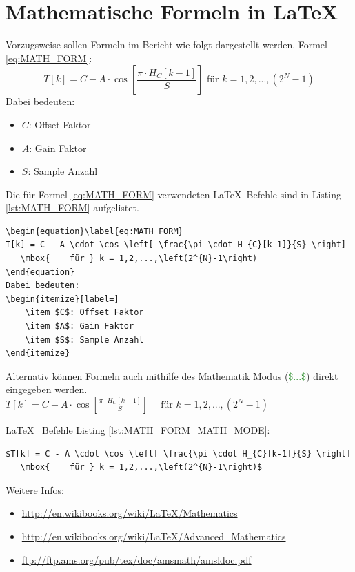 \documentclass[TGAI_Laborbericht.tex]{subfiles}
\begin{document}
\section{Mathematische Formeln in \LaTeX}
Vorzugsweise sollen Formeln im Bericht wie folgt dargestellt werden.\linebreak
Formel \ref{eq:MATH_FORM}:
\begin{equation}\label{eq:MATH_FORM}
T[k]=C-A\cdot\cos\left[\frac{\pi \cdot H_{C}[k-1]}{S}\right]   \mbox{    für } k = 1,2,...,\left(2^{N}-1\right)
\end{equation}
Dabei bedeuten:
\begin{itemize}[label=]
    \item $C$: Offset Faktor
    \item $A$: Gain Faktor
    \item $S$: Sample Anzahl
\end{itemize}
Die für Formel \ref{eq:MATH_FORM} verwendeten \LaTeX ~Befehle sind in Listing \ref{lst:MATH_FORM} aufgelistet.
\begin{lstlisting}[style=LATEX, frame=single, caption=Latex Befehle für Formel \ref{eq:MATH_FORM}, captionpos=b, label=lst:MATH_FORM_LST]
\begin{equation}\label{eq:MATH_FORM}
T[k] = C - A \cdot \cos \left[ \frac{\pi \cdot H_{C}[k-1]}{S} \right]
   \mbox{    für } k = 1,2,...,\left(2^{N}-1\right)
\end{equation}
Dabei bedeuten:
\begin{itemize}[label=]
    \item $C$: Offset Faktor
    \item $A$: Gain Faktor
    \item $S$: Sample Anzahl
\end{itemize}
\end{lstlisting}

Alternativ können Formeln auch mithilfe des Mathematik Modus (\textcolor{ForestGreen}{\$...\$}) direkt eingegeben werden.\linebreak
$T[k]=C-A\cdot\cos\left[\frac{\pi \cdot H_{C}[k-1]}{S}\right]   \text{~~~~für } k \equal 1,2,...,\left(2^{N}-1\right)$
\newpage

\LaTeX ~ Befehle Listing \ref{lst:MATH_FORM_MATH_MODE}:
\begin{lstlisting}[style=LATEX, frame=single, caption=Mathematikmodus \LaTeX, captionpos=b, label=lst:MATH_FORM_MATH_MODE]
$T[k] = C - A \cdot \cos \left[ \frac{\pi \cdot H_{C}[k-1]}{S} \right]
   \mbox{    für } k = 1,2,...,\left(2^{N}-1\right)$
\end{lstlisting}
Weitere Infos:
\begin{itemize}
  \item \href{http://en.wikibooks.org/wiki/LaTeX/Mathematics}{http://en.wikibooks.org/wiki/LaTeX/Mathematics}
  \item \href{http://en.wikibooks.org/wiki/LaTeX/Advanced\_Mathematics}{http://en.wikibooks.org/wiki/LaTeX/Advanced\_Mathematics} 
  \item \href{ftp://ftp.ams.org/pub/tex/doc/amsmath/amsldoc.pdf}{ftp://ftp.ams.org/pub/tex/doc/amsmath/amsldoc.pdf}
\end{itemize}
\newpage
\end{document}
